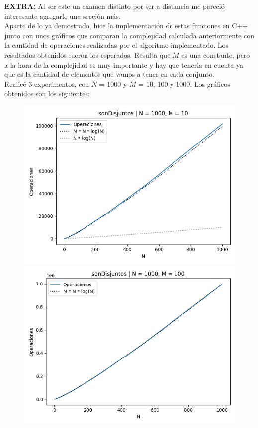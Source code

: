 \documentclass[10pt, a4paper]{article}
\begin{document}
\textbf{EXTRA:}
Al ser este un examen distinto por ser a distancia me pareci\'o interesante agregarle una secci\'on m\'as. \\ Aparte de lo ya demostrado, hice la implementaci\'on de estas funciones en C++ junto con unos gr\'aficos que comparan la complejidad calculada anteriormente con la cantidad de operaciones realizadas por el algoritmo implementado.
Los resultados obtenidos fueron los esperados. Resulta que $M$ es una constante, pero a la hora de la complejidad es muy importante y hay que tenerla en cuenta ya que es la cantidad de elementos que vamos a tener en cada conjunto. \\
Realic\'e 3 experimentos, con $N$ = 1000 y $M$ = 10, 100 y 1000.
Los gr\'aficos obtenidos son los siguientes:
\begin{figure}[H]
    \includegraphics[width=\linewidth]{img/sonDisjuntos_1000_10}
  \endminipage\hfill
    \includegraphics[width=\linewidth]{img/sonDisjuntos_1000_100}

\end{figure}
\end{document}
